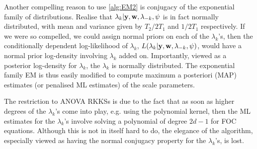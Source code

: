 \begin{remark}
  Another compelling reason to use \cref{alg:EM2} is conjugacy of the exponential family of distributions.
  Realise that $\lambda_k|{\mathbf y},{\mathbf w},\lambda_{-k},\psi$ is in fact normally distributed, with mean and variance given by $T_2/2T_1$ and $1/2T_1$ respectively.
  If we were so compelled, we could assign normal priors on each of the $\lambda_k$'s, then the conditionally dependent log-likelihood of $\lambda_k$, $L(\lambda_k|{\mathbf y},{\mathbf w},\lambda_{-k},\psi)$, would have a normal prior log-density involving $\lambda_k$ added on.
  Importantly, viewed as a posterior log-density for $\lambda_k$, the $\lambda_k$ is normally distributed.
  The exponential family EM is thus easily modified to compute maximum a posteriori (MAP) estimates (or penalised ML estimates) of the scale parameters.
\end{remark}

\begin{remark}
  The restriction to ANOVA RKKSs is due to the fact that as soon as higher degrees of the $\lambda_k$'s come into play, e.g. using the polynomial kernel, then the ML estimates for the $\lambda_k$'s involve solving a polynomial of degree $2d-1$ for FOC equations.
  Although this is not in itself hard to do, the elegance of the algorithm, especially viewed as having the normal conjugacy property for the $\lambda_k$'s, is lost.
\end{remark}

%
%
